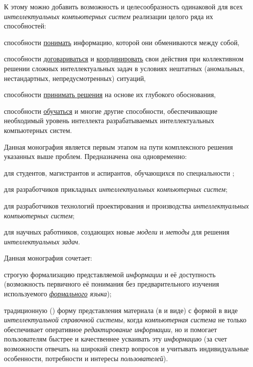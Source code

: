 \begin{SCn}
{К этому можно добавить возможность и целесообразность  одинаковой  для всех \textit{интеллектуальных компьютерных систем} реализации целого ряда их способностей: 
\begin{scnitemize}
	\item способности \uline{понимать} информацию, которой они обмениваются между собой,
	\item способности  \uline{договариваться} и \uline{координировать} свои действия при коллективном решении сложных интеллектуальных задач в условиях нештатных (аномальных, нестандартных, непредусмотренных) ситуаций,
	\item способности \uline{принимать решения} на основе их глубокого  обоснования,
	\item способности \uline{обучаться} и многие другие способности, обеспечивающие необходимый уровень интеллекта разрабатываемых интеллектуальных компьютерных систем.
\end{scnitemize}

Данная монография является первым этапом на пути комплексного решения указанных выше проблем.
Предназначена она одновременно:
\begin{scnitemize}
	\item для студентов, магистрантов и аспирантов, обучающихся по специальности ;
	\item для разработчиков прикладных \textit{интеллектуальных компьютерных систем};
	\item для разработчиков технологий проектирования и производства \textit{интеллектуальных компьютерных систем};
	\item для научных работников, создающих новые \textit{модели} и \textit{методы} для решения \textit{интеллектуальных задач}.
\end{scnitemize}

Данная монография сочетает:
\begin{scnitemize}
	\item строгую формализацию представляемой \textit{информации} и её доступность (возможность первичного её понимания без предварительного изучения используемого \textit{\uline{формального} языка});
	\item традиционную () форму представления материала (в  и  виде) с  формой в виде \textit{интеллектуальной справочной системы}, когда \textit{компьютерная система} не только обеспечивает оперативное \textit{редактирование информации}, но и помогает пользователям  быстрее и  качественнее усваивать эту \textit{информацию} (за счет возможности отвечать на широкий спектр вопросов и учитывать индивидуальные особенности, потребности и интересы \textit{пользователей}). 
\end{scnitemize}

}
\end{SCn}
